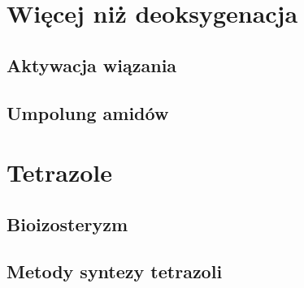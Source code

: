 \section{Więcej niż deoksygenacja}
\subsection{Aktywacja wiązania }
\subsection{Umpolung amidów}

\section{Tetrazole}
\subsection{Bioizosteryzm}
\subsection{Metody syntezy tetrazoli}
